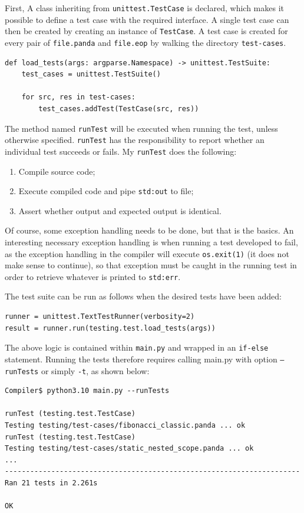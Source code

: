 First, A class inheriting from \texttt{unittest.TestCase} is declared, which makes it possible to define a test case with the required interface. A single test case can then be created by creating an instance of \texttt{TestCase}. A test case is created for every pair of \texttt{file.panda} and \texttt{file.eop} by walking the directory \texttt{test-cases}.

\begin{verbatim}
def load_tests(args: argparse.Namespace) -> unittest.TestSuite:
    test_cases = unittest.TestSuite()

    for src, res in test-cases:
        test_cases.addTest(TestCase(src, res))
\end{verbatim}

The method named \texttt{runTest} will be executed when running the test, unless otherwise specified. \texttt{runTest} has the responsibility to report whether an individual test succeeds or fails. My \texttt{runTest} does the following:

\begin{enumerate}
    \item Compile source code;
    \item Execute compiled code and pipe \texttt{std:out} to file;
    \item Assert whether output and expected output is identical.
\end{enumerate}

Of course, some exception handling needs to be done, but that is the basics. An interesting necessary exception handling is when running a test developed to fail, as the exception handling in the compiler will execute \texttt{os.exit(1)} (it does not make sense to continue), so that exception must be caught in the running test in order to retrieve whatever is printed to \texttt{std:err}.

The test suite can be run as follows when the desired tests have been added:

\begin{verbatim}
runner = unittest.TextTestRunner(verbosity=2)
result = runner.run(testing.test.load_tests(args))
\end{verbatim}

The above logic is contained within \texttt{main.py} and wrapped in an \texttt{if-else} statement. Running the tests therefore requires calling main.py with option \texttt{--runTests} or simply \texttt{-t}, as shown below:

\begin{verbatim}
Compiler$ python3.10 main.py --runTests

runTest (testing.test.TestCase)
Testing testing/test-cases/fibonacci_classic.panda ... ok
runTest (testing.test.TestCase)
Testing testing/test-cases/static_nested_scope.panda ... ok
...
----------------------------------------------------------------------
Ran 21 tests in 2.261s

OK 
\end{verbatim}

